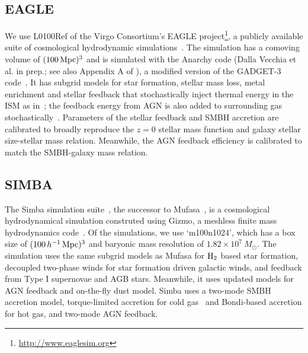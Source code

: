 \subsection{EAGLE} \label{sec:eagle} 
We use L0100Ref of the Virgo Consortium's EAGLE
project\footnote{\url{http://www.eaglesim.org}}, a publicly available suite of
cosmological hydrodynamic simulations~\citep{schaye2015, crain2015,
mcalpine2016}. The simulation has a comoving volume of $(100\,{\rm Mpc})^3$ and %
is simulated with the {\sc Anarchy} code (Dalla Vecchia et al. in prep.; 
see also Appendix A of \citealt{schaye2015}), a modified version of the 
{\sc GADGET-3} code~\citep{springel2005}.
It has subgrid models for star formation, stellar mass loss, metal enrichment
and stellar feedback that stochastically inject thermal energy in the ISM as
in~\citep{dallavecchia2012}; the feedback energy from AGN is also added to
surrounding gas stochastically~\citep{booth2009}. Parameters of the stellar 
feedback and SMBH accretion are calibrated to broadly reproduce the $z=0$ 
stellar mass function and galaxy stellar size-stellar mass relation. Meanwhile, 
the AGN feedback efficiency is calibrated to match the SMBH-galaxy mass relation. 

\subsection{SIMBA} \label{sec:simba}
The {\sc Simba} simulation suite~\citep{dave2019}, the successor to {\sc
Mufasa}~\citep{dave2016, dave2017, dave2017a}, is a cosmological hydrodynamical
simulation construted using {\sc Gizmo}, a meshless finite mass hydrodynamics 
code~\citep{hopkins2015, hopkins2017}. Of the simulations, we use
`m100n1024', which has a box size of $(100\,h^{-1}\,{\rm Mpc})^3$ and baryonic 
mass resolution of $1.82 \times 10^7\ M_\odot$. The simulation uses the same
subgrid models as {\sc Mufasa} for $\rm H_2$ based star formation, decoupled
two-phase winds for star formation driven galactic winds, and feedback from 
Type I supernovae and AGB stars. Meanwhile, it uses updated models for AGN
feedback and on-the-fly dust model. {\sc Simba} uses a two-mode SMBH accretion 
model, torque-limited accretion for cold gas~\citep{angles-alcazar2017} and 
Bondi-based accretion for hot gas, and two-mode AGN feedback. %

